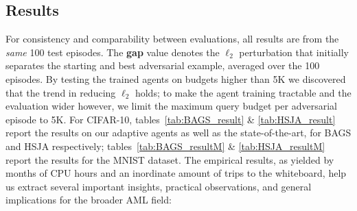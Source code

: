 \subsection{Results}
For consistency and comparability between evaluations, all results are from the \emph{same} 100 test episodes.
The \textbf{gap} value denotes the $\ell_2$ perturbation that initially separates the starting and best adversarial example, averaged over the 100 episodes. 
By testing the trained agents on budgets higher than 5K we discovered that the trend in reducing $\ell_2$ holds; to make the agent training tractable and the evaluation wider however, we limit the maximum query budget per adversarial episode to 5K.
For CIFAR-10, tables~\ref{tab:BAGS_result} \& \ref{tab:HSJA_result} report the results on our adaptive agents as well as the state-of-the-art, for BAGS and HSJA respectively; tables~\ref{tab:BAGS_resultM} \& \ref{tab:HSJA_resultM} report the results for the MNIST dataset. 
The empirical results, as yielded by months of CPU hours and an inordinate amount of trips to the whiteboard, help us extract several important insights, practical observations, and general implications for the broader \gls{AML} field:

